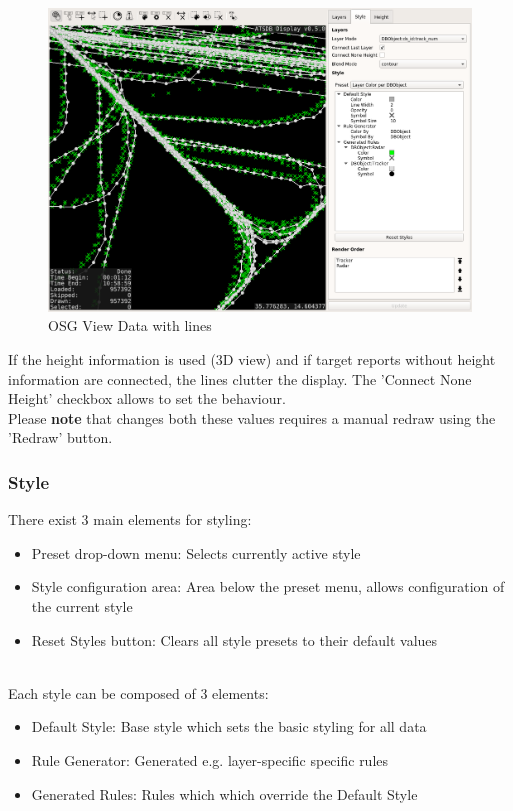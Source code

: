 \begin{figure}[H]
    \hspace*{-2.5cm}
    \includegraphics[width=19cm,frame]{figures/osgview_connect_lines.png}
  \caption{OSG View Data with lines}
\end{figure}

If the height information is used (3D view) and if target reports without height information are connected, the lines clutter the display. The 'Connect None Height' checkbox allows to set the behaviour. \\

Please \textbf{note} that changes both these values requires a manual redraw using the 'Redraw' button.

\subsubsection{Style}
\label{sec:style}

There exist 3 main elements for styling:
\begin{itemize}
 \item Preset drop-down menu: Selects currently active style
 \item Style configuration area: Area below the preset menu, allows configuration of the current style
 \item Reset Styles button: Clears all style presets to their default values
\end{itemize}
\  \\

Each style can be composed of 3 elements:
\begin{itemize}
 \item Default Style: Base style which sets the basic styling for all data
 \item Rule Generator: Generated e.g. layer-specific specific rules
 \item Generated Rules: Rules which which override the Default Style
\end{itemize}
\  \\

